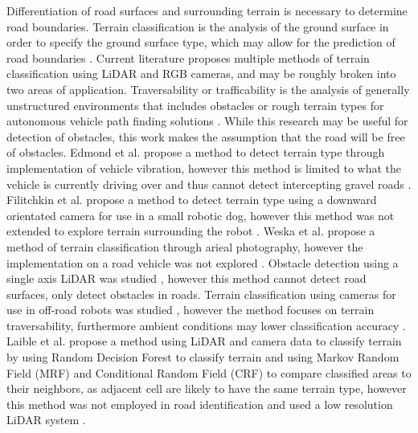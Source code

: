 \documentclass[numbered,pdftex]{ohio-etd}
\begin{document}
{{		{Differentiation of road surfaces and surrounding terrain is necessary to determine road boundaries. Terrain classification is the analysis of the ground surface in order to specify the ground surface type, which may allow for the prediction of road boundaries \cite{laible_3d_2012,laible_terrain_2013,laible_map_building,rasmussen_combining_2002,reymann_improving_2015,walas_terrain_2014,wietrzykowski_boosting_2014,wang_road_nodate}. Current literature proposes multiple methods of terrain classification using LiDAR and RGB cameras, and may be roughly broken into two areas of application. Traversability or trafficability is the analysis of generally unstructured environments that includes obstacles or rough terrain types for autonomous vehicle path finding solutions  \cite{schilling_geometric_2017,ojeda_terrain_2006,coombs_driving_2000,stavens_self-supervised_nodate,belter_rough_2010,bartoszyk_terrain-aware_2017,noauthor_fusion_nodate,li_rugged_2019,wilson_terrain_2014,siva_robot_2019}. While this research may be useful for detection of obstacles, this work makes the assumption that the road will be free of obstacles. Edmond et al. propose a method to detect terrain type through implementation of vehicle vibration, however this method is limited to what the vehicle is currently driving over and thus cannot detect intercepting gravel roads \cite{dupont_online_2008}. Filitchkin et al. propose a method to detect terrain type using a downward orientated camera for use in a small robotic dog, however this method was not extended to explore terrain surrounding the robot \cite{filitchkin_feature_based_2012}. Weska et al. propose a method of terrain classification through arieal photography, however the implementation on a road vehicle was not explored \cite{weszka_comparative_1976}. Obstacle detection using a single axis LiDAR was studied \cite{manduchi_obstacle_2005}, however this method cannot detect road surfaces, only detect obstacles in roads. Terrain classification using cameras for use in off-road robots was studied \cite{walch_offroad_2022}, however the method focuses on terrain traversability, furthermore ambient conditions may lower classification accuracy \cite{levi_3d_2012_light}. Laible et al. propose a method using LiDAR and camera data to classify terrain by using Random Decision Forest to classify terrain and using Markov Random Field (MRF) and Conditional Random Field (CRF) to compare classified areas to their neighbors, as adjacent cell are likely to have the same terrain type, however this method was not employed in road identification and used a low resolution LiDAR system \cite{chellappa_classification_1985,wallach_conditional_nodate,haselich_terrain_2011,zhao_fusion_2014}.}
			
}}
\end{document}

